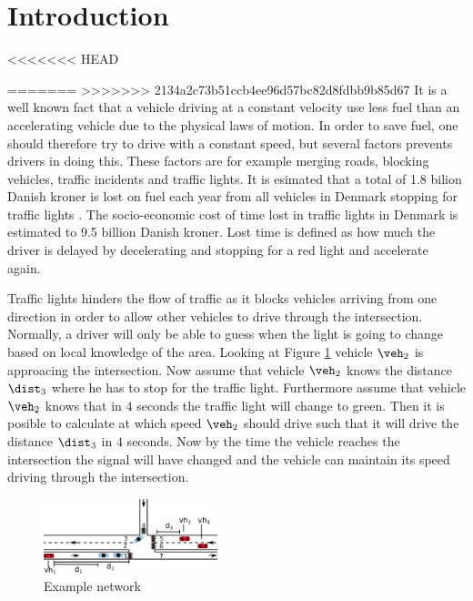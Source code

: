 \section{Introduction}
<<<<<<< HEAD

=======
>>>>>>> 2134a2c73b51ccb4ee96d57bc82d8fdbb9b85d67
It is a well known fact that a vehicle driving at a constant velocity use less fuel than an accelerating vehicle due to the physical laws of motion\cite{Vejdir}.
In order to save fuel, one should therefore try to drive with a constant speed, but several factors prevents drivers in doing this. 
These factors are for example merging roads, blocking vehicles, traffic incidents and traffic lights. 
It is esimated that a total of 1.8 bilion Danish kroner is lost on fuel each year from all vehicles in Denmark stopping for traffic lights \cite{Vejdir}.
The socio-economic cost of time lost in traffic lights in Denmark is estimated to 9.5 billion Danish kroner. 
Lost time is defined as how much the driver is delayed by decelerating and stopping for a red light and accelerate again\cite{Vejdir}.

Traffic lights hinders the flow of traffic as it blocks vehicles arriving from one direction in order to allow other vehicles to drive through the intersection.
Normally, a driver will only be able to guess when the light is going to change based on local knowledge of the area. 
Looking at Figure \ref{fig:Introduction:network} vehicle $\veh_2$ is approacing the intersection.
Now assume that vehicle $\veh_2$ knows the distance $\dist_3$ where he has to stop for the traffic light. 
Furthermore assume that vehicle $\veh_2$ knows that in $4$ seconds the traffic light will change to green. 
Then it is posible to calculate at which speed $\veh_2$ should drive such that it will drive the distance $\dist_3$ in $4$ seconds. 
Now by the time the vehicle reaches the intersection the signal will have changed and the vehicle can maintain its speed driving through the intersection.
\begin{figure}[htb]
\centering
\includegraphics[width=0.45\textwidth]{../images/introNetwork.png}
\caption{Example network}
\label{fig:Introduction:network}
\end{figure}

